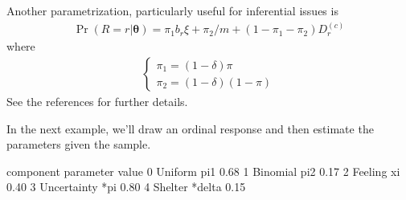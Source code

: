 \documentclass[letterpaper,10pt,english]{sphinxmanual}
\begin{document}
\sphinxAtStartPar
Another parametrization, particularly useful for inferential issues is
\begin{equation*}
\begin{split}\Pr(R=r|\boldsymbol{\theta}) = \pi_1 b_r{\xi} + \pi_2 /m  + (1-\pi_1-\pi_2) D_r^{(c)}\end{split}
\end{equation*}
\sphinxAtStartPar
where
\begin{equation*}
\begin{split}\left\{
\begin{array}{l}
    \pi_1 = (1-\delta)\pi
    \\
    \pi_2 = (1-\delta)(1-\pi)
\end{array}
\right.\end{split}
\end{equation*}
\sphinxAtStartPar
See the references for further details.

\sphinxAtStartPar
In the next example, we’ll draw an ordinal response
and then estimate the parameters given the sample.
\def\sphinxLiteralBlockLabel{\label{\detokenize{manual:id49}}}
\begin{sphinxVerbatim}[commandchars=\\\{\},numbers=left,firstnumber=1,stepnumber=1]
   
    

  
     
      
     

\end{sphinxVerbatim}

\begin{sphinxVerbatim}[commandchars=\\\{\}]
     component parameter  value
0      Uniform       pi1   0.68
1     Binomial       pi2   0.17
2      Feeling        xi   0.40
3  Uncertainty       *pi   0.80
4      Shelter    *delta   0.15
\end{sphinxVerbatim}
\end{document}
